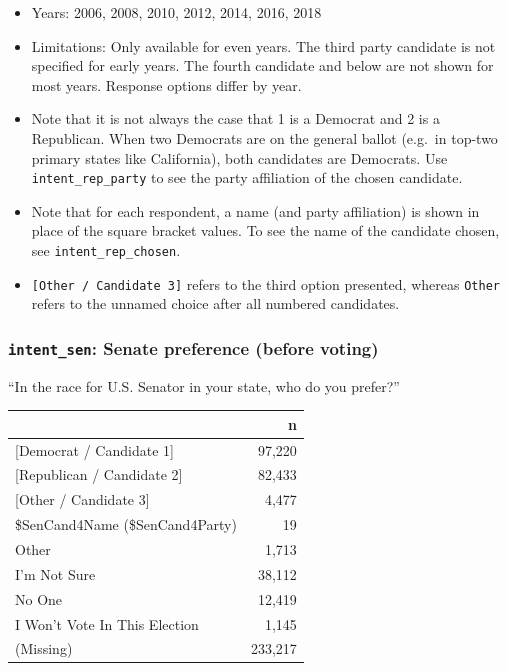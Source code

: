 \documentclass[10pt,article,oneside]{memoir}
\theoremstyle{definition}
\begin{document}
\begin{itemize}
\tightlist
\item
  Years: 2006, 2008, 2010, 2012, 2014, 2016, 2018
\item
  Limitations: Only available for even years. The third party candidate
  is not specified for early years. The fourth candidate and below are
  not shown for most years. Response options differ by year.
\item
  Note that it is not always the case that 1 is a Democrat and 2 is a
  Republican. When two Democrats are on the general ballot (e.g.~in
  top-two primary states like California), both candidates are
  Democrats. Use \texttt{intent\_rep\_party} to see the party
  affiliation of the chosen candidate.
\item
  Note that for each respondent, a name (and party affiliation) is shown
  in place of the square bracket values. To see the name of the
  candidate chosen, see \texttt{intent\_rep\_chosen}.
\item
  \texttt{{[}Other\ /\ Candidate\ 3{]}} refers to the third option
  presented, whereas \texttt{Other} refers to the unnamed choice after
  all numbered candidates.
\end{itemize}

\hypertarget{intent_sen-senate-preference-before-voting}{%
\subsubsection{\texorpdfstring{\texttt{intent\_sen}: Senate preference
(before
voting)}{intent\_sen: Senate preference (before voting)}}\label{intent_sen-senate-preference-before-voting}}

``In the race for U.S. Senator in your state, who do you prefer?''

\begin{table}[H]
\centering
\begin{tabular}{lr}
\toprule
 & n\\
\midrule
{[Democrat / Candidate 1]} & 97,220\\
{[Republican / Candidate 2]} & 82,433\\
{[Other / Candidate 3]} & 4,477\\
\$SenCand4Name (\$SenCand4Party) & 19\\
Other & 1,713\\
I'm Not Sure & 38,112\\
No One & 12,419\\
I Won't Vote In This Election & 1,145\\
(Missing) & 233,217\\
\bottomrule
\end{tabular}
\end{table}
\end{document}
